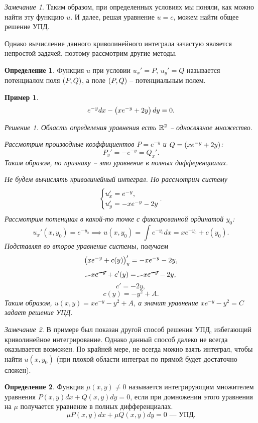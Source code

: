 \documentclass[a5paper, 10pt]{article}
\theoremstyle{definition}
\newtheorem{Def}{Определение}
\theoremstyle{plain}
\newtheorem{Ex}{Пример}
\theoremstyle{remark}
\newtheorem*{Note}{Замечание}
\newtheorem*{Solution}{Решение}
\begin{document}
	\begin{Note}
		Таким образом, при определенных условиях мы поняли, как можно найти эту функцию $u$. И далее, решая уравнение $u=c$, можем найти общее решение УПД.
		
		Однако вычисление данного криволинейного интеграла зачастую является непростой задачей, поэтому рассмотрим другие методы.
	\end{Note}
	
	 \begin{Def}
		Функция $u$ при условии $u_x'=P$, $u_y'=Q$ называется потенциалом поля $\left(P,Q\right)$, а поле $\left(P,Q\right)$ -- потенциальным полем. 
	\end{Def}
	
	\begin{Ex}
		\[
		e^{-y}dx - \left(xe^{-y}+2y\right) dy = 0.
		\]
		\begin{Solution}
			Область определения уравнения есть $\mathbb{R}^2$ -- односвязное множество. 
			
			Рассмотрим производные коэффициентов $P=e^{-y}$ и $Q = \left(xe^{-y}+2y\right)$:
			\[
				P_y' = -e^{-y} = Q_x'.
			\]
			Таким образом, по признаку -- это уравнение в полных дифференциалах. 
			
			Не будем вычислять криволинейный интеграл. Но рассмотрим систему
			\[
			\case{u'_x = e^{-y}, \\ 
					u_y' = -xe^{-y}-2y}.
			\]
			Рассмотрим потенциал в какой-то точке с фиксированной ординатой $y_0$: 
			\[
			u_x' (x, y_0) = e^{-y_0} \implies u(x, y_0) = \int e^{-y_0} dx = xe^{-y_0} + c(y_0).
			\]
			Подставляя во второе уравнение системы, получаем
			\[
			\left(xe^{-y} + c(y)\right)_y' = -xe^{-y} - 2y,
			\]
			\[
			\cancel{-xe^{-y}} + c'(y) = \cancel{-xe^{-y}} - 2y,
			\]
			\[
			c' = -2y,
			\]
			\[
			c(y) = -y^2 + A.
			\]
			Таким образом, $u(x,y) = xe^{-y} -y^2 + A$, а значит уравнение $ xe^{-y} -y^2 = C$ задает решение УПД.
		\end{Solution}
	\end{Ex}
	
	\begin{Note}
		В примере был показан другой способ решения УПД, избегающий криволинейное интегрирование. Однако данный способ далеко не всегда оказывается возможен. По крайней мере, не всегда можно взять интеграл, чтобы найти $u(x, y_0)$ (при плохой области интеграл по прямой будет достаточно сложен).
	\end{Note}
	
	\begin{Def}
		Функция $\mu(x,y) \neq 0$ называется интегрирующим множителем уравнения $P(x,y)dx + Q(x,y)dy = 0$, если при домножении этого уравнения на $\mu$ получается уравнение в полных дифференциалах.
		\[
		\mu P(x,y)dx + \mu Q(x,y)dy = 0 \text{ --- УПД.}
		\]
	\end{Def}
	
\end{document}
